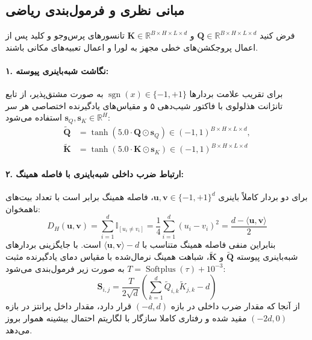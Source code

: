 \subsection{مبانی نظری و فرمول‌بندی ریاضی}
فرض کنید $\mathbf{Q} \in \mathbb{R}^{B \times H \times L \times d}$ و $\mathbf{K} \in \mathbb{R}^{B \times H \times L \times d}$ تانسورهای پرس‌وجو و کلید پس از اعمال پروجکشن‌های خطی مجهز به لورا و اعمال تعبیه‌های مکانی  باشند.

\paragraph{۱. نگاشت شبه‌باینری پیوسته:}
برای تقریب علامت بردارها $\operatorname{sgn}(x) \in \{-1, +1\}$ به صورت مشتق‌پذیر، از تابع تانژانت هذلولوی با فاکتور شیب‌دهی ۵ و مقیاس‌های یادگیرنده اختصاصی هر سر $\mathbf{s}_Q, \mathbf{s}_K \in \mathbb{R}^H$ استفاده می‌شود:
\begin{align}
\tilde{\mathbf{Q}} &= \tanh\left(5.0 \cdot \mathbf{Q} \odot \mathbf{s}_Q\right) \in (-1, 1)^{B \times H \times L \times d}, \\
\tilde{\mathbf{K}} &= \tanh\left(5.0 \cdot \mathbf{K} \odot \mathbf{s}_K\right) \in (-1, 1)^{B \times H \times L \times d}
\end{align}

\paragraph{۲. ارتباط ضرب داخلی شبه‌باینری با فاصله همینگ:}
برای دو بردار کاملاً باینری $\mathbf{u}, \mathbf{v} \in \{-1, +1\}^d$، فاصله همینگ برابر است با تعداد بیت‌های ناهمخوان:
\begin{equation}
D_H(\mathbf{u}, \mathbf{v}) = \sum_{i=1}^d \mathbb{I}_{[u_i \ne v_i]} = \frac{1}{4} \sum_{i=1}^d (u_i - v_i)^2 = \frac{d - \langle \mathbf{u}, \mathbf{v} \rangle}{2}
\end{equation}
بنابراین منفی فاصله همینگ متناسب با $\langle \mathbf{u}, \mathbf{v} \rangle - d$ است. با جایگزینی بردارهای شبه‌باینری پیوسته $\tilde{\mathbf{Q}}$ و $\tilde{\mathbf{K}}$، شباهت همینگ نرمال‌شده با مقیاس دمای یادگیرنده مثبت $T = \operatorname{Softplus}(\tau) + 10^{-3}$ به صورت زیر فرمول‌بندی می‌شود:
\begin{equation}
\mathbf{S}_{i, j} = \frac{T}{2 \sqrt{d}} \left( \sum_{k=1}^d \tilde{Q}_{i, k} \tilde{K}_{j, k} - d \right)
\end{equation}
از آنجا که مقدار ضرب داخلی در بازه $(-d, d)$ قرار دارد، مقدار داخل پرانتز در بازه $(-2d, 0)$ مقید شده و رفتاری کاملا سازگار با لگاریتم احتمال بیشینه هموار بروز می‌دهد.

